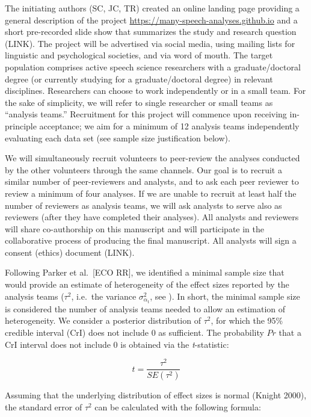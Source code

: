 \documentclass[
  12pt,
]{article}
\begin{document}
The initiating authors (SC, JC, TR) created an online landing page providing a general description of the project \url{https://many-speech-analyses.github.io} and a short pre-recorded slide show that summarizes the study and research question (LINK).
The project will be advertised via social media, using mailing lists for linguistic and psychological societies, and via word of mouth.
The target population comprises active speech science researchers with a graduate/doctoral degree (or currently studying for a graduate/doctoral degree) in relevant disciplines.
Researchers can choose to work independently or in a small team.
For the sake of simplicity, we will refer to single researcher or small teams as ``analysis teams.''
Recruitment for this project will commence upon receiving in-principle acceptance; we aim for a minimum of 12 analysis teams independently evaluating each data set (see sample size justification below).

We will simultaneously recruit volunteers to peer-review the analyses conducted by the other volunteers through the same channels.
Our goal is to recruit a similar number of peer-reviewers and analysts, and to ask each peer reviewer to review a minimum of four analyses.
If we are unable to recruit at least half the number of reviewers as analysis teams, we will ask analysts to serve also as reviewers (after they have completed their analyses).
All analysts and reviewers will share co-authorship on this manuscript and will participate in the collaborative process of producing the final manuscript.
All analysts will sign a consent (ethics) document (LINK).

Following Parker et al.~{[}ECO RR{]}, we identified a minimal sample size that would provide an estimate of heterogeneity of the effect sizes reported by the analysis teams (\(\tau^2\), i.e.~the variance \(\sigma^2_{\alpha_{\text{t}}}\), see ).
In short, the minimal sample size is considered the number of analysis teams needed to allow an estimation of heterogeneity.
We consider a posterior distribution of \(\tau^2\), for which the 95\% credible interval (CrI) does not include 0 as sufficient.
The probability \(Pr\) that a CrI interval does not include 0 is obtained via the \emph{t}-statistic:

\[t = \frac{\tau^2}{SE(\tau^2)}\]

Assuming that the underlying distribution of effect sizes is normal (Knight 2000), the standard error of \(\tau^2\) can be calculated with the following formula:
\end{document}

